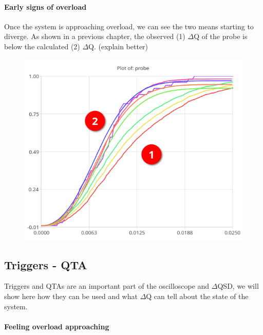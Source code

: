 \paragraph{Early signs of overload}
    
    Once the system is approaching overload, we can see the two means starting to diverge. As shown in a previous chapter, the observed (1) $\Delta$Q of the probe is below the calculated (2) $\Delta$Q. (explain better) 
    \begin{figure}[H]
        \begin{center}
            \includegraphics[scale=0.6]{img/diverging11.png}
        \end{center}
    \end{figure}

    \subsection{Triggers - QTA}
        Triggers and QTAs are an important part of the oscilloscope and $\Delta$QSD, we will show here how they can be used and what $\Delta$Q can tell about the state of the system.

        \paragraph{Feeling overload approaching}

